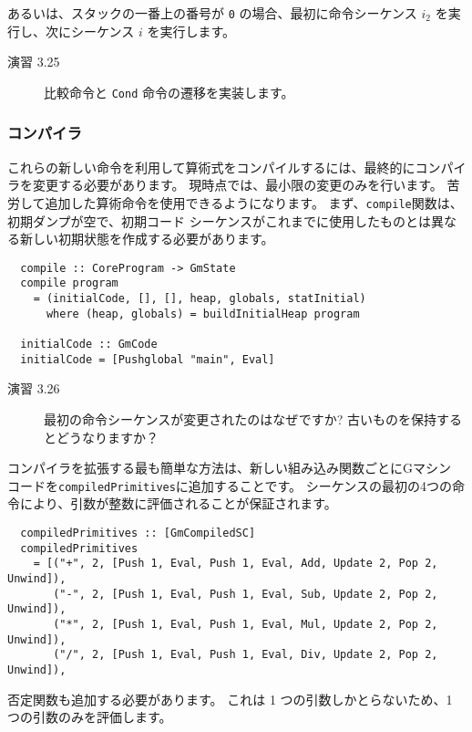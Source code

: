 \documentclass{jarticle}
\begin{document}
あるいは、スタックの一番上の番号が \texttt{0} の場合、最初に命令シーケンス $i_2$ を実行し、次にシーケンス $i$ を実行します。

\begin{description}
	\item[演習 3.25] 比較命令と \texttt{Cond} 命令の遷移を実装します。
\end{description}

\subsubsection{コンパイラ}

これらの新しい命令を利用して算術式をコンパイルするには、最終的にコンパイラを変更する必要があります。
現時点では、最小限の変更のみを行います。
苦労して追加した算術命令を使用できるようになります。
まず、\texttt{compile}関数は、初期ダンプが空で、初期コード シーケンスがこれまでに使用したものとは異なる新しい初期状態を作成する必要があります。

\begin{verbatim}
  compile :: CoreProgram -> GmState
  compile program
    = (initialCode, [], [], heap, globals, statInitial)
      where (heap, globals) = buildInitialHeap program

  initialCode :: GmCode
  initialCode = [Pushglobal "main", Eval]
\end{verbatim}

\begin{description}
	\item[演習 3.26] 最初の命令シーケンスが変更されたのはなぜですか?
		古いものを保持するとどうなりますか？
\end{description}

コンパイラを拡張する最も簡単な方法は、新しい組み込み関数ごとにGマシン コードを\texttt{compiledPrimitives}に追加することです。
シーケンスの最初の4つの命令により、引数が整数に評価されることが保証されます。

\begin{verbatim}
  compiledPrimitives :: [GmCompiledSC]
  compiledPrimitives
    = [("+", 2, [Push 1, Eval, Push 1, Eval, Add, Update 2, Pop 2, Unwind]),
       ("-", 2, [Push 1, Eval, Push 1, Eval, Sub, Update 2, Pop 2, Unwind]),
       ("*", 2, [Push 1, Eval, Push 1, Eval, Mul, Update 2, Pop 2, Unwind]),
       ("/", 2, [Push 1, Eval, Push 1, Eval, Div, Update 2, Pop 2, Unwind]),
\end{verbatim}

否定関数も追加する必要があります。
これは 1 つの引数しかとらないため、1 つの引数のみを評価します。
\end{document}
